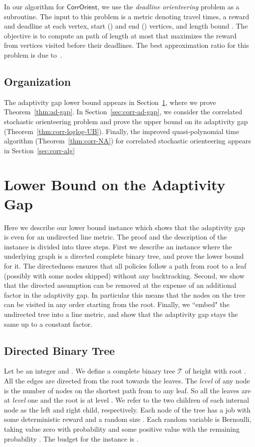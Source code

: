 \documentclass[11pt,letterpaper]{article}
\numberwithin{algorithm}{section}
\newcommand{\T}{\ensuremath{\mathcal{T}}\xspace}
\newcommand{\co}{\ensuremath{\mathsf{CorrOrient}}\xspace}
\begin{document}
In our algorithm for \co, we use the {\em deadline orienteering} problem as a subroutine.
The input to this problem is a metric  denoting travel times, a reward and deadline at each vertex, start () and end () vertices, and length bound . The objective is to compute an  path of length at most  that maximizes the reward from vertices visited before their deadlines.
The best approximation ratio for this problem is   due to~\cite{BBCM04,CKP08}.


\subsection{Organization}
The adaptivity gap lower bound appears in Section~\ref{sec:ad-gap}, where we prove Theorem~\ref{thm:ad-gap}. In Section~\ref{sec:corr-ad-gap}, we consider the correlated stochastic orienteering problem and prove the upper bound on its adaptivity gap (Theorem~\ref{thm:corr-loglog-UB}). Finally, the improved quasi-polynomial time algorithm (Theorem~\ref{thm:corr-NA}) for correlated stochastic orienteering appears in Section~\ref{sec:corr-alg}

\section{Lower Bound on the Adaptivity Gap}\label{sec:ad-gap}
Here we describe our lower bound instance which shows that the adaptivity gap is  even for an undirected line metric. The proof and the description of the instance is divided into three steps. First we describe an instance where the underlying graph is a directed complete binary tree, and prove the lower bound for it. The directedness ensures that all policies follow a path from root to a leaf (possibly with some nodes skipped) without any backtracking. Second, we show that the directed assumption can be removed at the expense of an additional  factor in the adaptivity gap. In particular this means that the nodes on the tree can be visited in any order starting from the root. Finally, we ``embed" the undirected tree into a line metric, and show that the adaptivity gap stays the same up to a constant factor.

\subsection{Directed Binary Tree}

Let  be an integer and . We define a complete binary tree \T of height  with root .
All the edges are directed from the root towards the leaves.
The {\em level}  of any node  is the number of nodes on the shortest path from  to any leaf. So all the leaves are at {\em level} one and the root  is at level . We refer to the two children of each internal node as the left and right child, respectively. Each node  of the tree has a job with some deterministic reward  and a random size . Each random variable  is Bernoulli, taking value zero with probability  and some positive value  with the remaining probability . The budget for the instance is .
\end{document}
